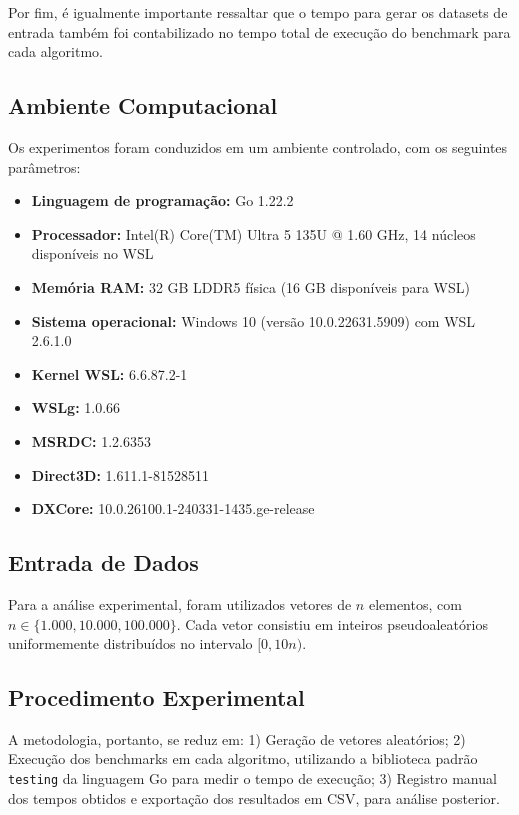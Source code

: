 \documentclass[12pt]{article}
\begin{document}
Por fim, é igualmente importante ressaltar que o tempo para gerar os datasets de entrada também foi contabilizado no tempo total de execução do benchmark para cada algoritmo.

\subsection{Ambiente Computacional}

Os experimentos foram conduzidos em um ambiente controlado, com os seguintes parâmetros:

\begin{itemize}
    \item \textbf{Linguagem de programação:} Go 1.22.2
    \item \textbf{Processador:} Intel(R) Core(TM) Ultra 5 135U @ 1.60 GHz, 14 núcleos disponíveis no WSL
    \item \textbf{Memória RAM:} 32 GB LDDR5 física (16 GB disponíveis para WSL)
    \item \textbf{Sistema operacional:} Windows 10 (versão 10.0.22631.5909) com WSL 2.6.1.0
    \item \textbf{Kernel WSL:} 6.6.87.2-1
    \item \textbf{WSLg:} 1.0.66
    \item \textbf{MSRDC:} 1.2.6353
    \item \textbf{Direct3D:} 1.611.1-81528511
    \item \textbf{DXCore:} 10.0.26100.1-240331-1435.ge-release
\end{itemize}

\subsection{Entrada de Dados}

Para a análise experimental, foram utilizados vetores de $n$ elementos, com $n \in \{1.000, 10.000, 100.000\}$. Cada vetor consistiu em inteiros pseudoaleatórios uniformemente distribuídos no intervalo $[0, 10n)$.

\subsection{Procedimento Experimental}

A metodologia, portanto, se reduz em: 1) Geração de vetores aleatórios; 2) Execução dos benchmarks em cada algoritmo, utilizando a biblioteca padrão \texttt{testing} da linguagem Go para medir o tempo de execução; 3) Registro manual dos tempos obtidos e exportação dos resultados em CSV, para análise posterior.
\end{document}
